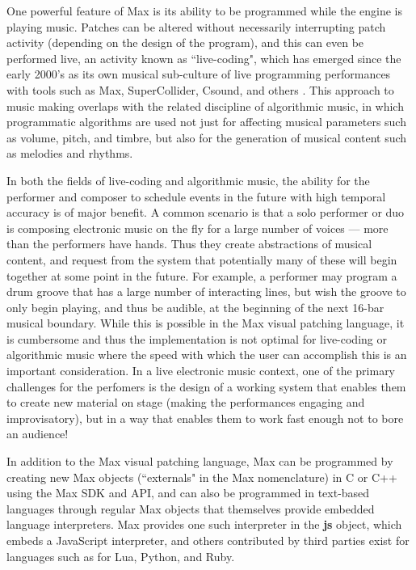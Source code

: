 \documentclass[acmsmall]{acmart}
\begin{document}
One powerful feature of Max is its ability to be programmed
while the engine is playing music. Patches can be altered 
without necessarily interrupting patch activity (depending on the design
of the program), and this can
even be performed live, an activity known as ``live-coding", which has
emerged since the early 2000's as its own musical sub-culture of 
live programming performances
with tools such as Max, SuperCollider, Csound, and others \cite{Roberts18}.
This approach to music making overlaps with the related discipline of 
algorithmic music, in which programmatic algorithms are used
not just for affecting musical parameters such as volume, pitch, and timbre, 
but also for the generation of musical content such as melodies
and rhythms.

In both the fields of live-coding and algorithmic music, the ability for
the performer and composer to schedule events in the future with high temporal
accuracy is of major benefit. A common scenario is that a solo performer or duo
is composing electronic music on the fly for a large number of voices --- more than
the performers have hands. Thus they create abstractions of musical content,
and request from the system that potentially many of these will begin together
at some point in the future. For example, a performer may program a drum
groove that has a large number of interacting lines, but wish the groove
to only begin playing, and thus be audible, at the beginning of the next 16-bar 
musical boundary. While this is possible in the Max visual
patching language, it is cumbersome and thus the implementation is not
optimal for live-coding or algorithmic music where the speed with which
the user can accomplish this is an important consideration. In a live
electronic music context, one of the primary challenges for the perfomers
is the design of a working system that enables them to create new material on
stage (making the performances engaging and improvisatory), 
but in a way that enables them to work fast enough not to bore an audience!

In addition to the Max visual patching language, Max can be programmed
by creating new Max objects (``externals" in the Max nomenclature) in C or C++ 
using the Max SDK and API, and can also be programmed in text-based 
languages through regular Max objects that themselves provide embedded language
interpreters. Max provides one such interpreter in the \textbf{js} object, 
which embeds a JavaScript interpreter, and others contributed by third parties
exist for languages such as for Lua, Python, and Ruby. 
\end{document}
